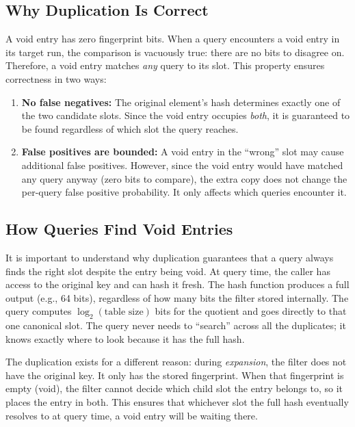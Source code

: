 \subsection{Why Duplication Is Correct}

A void entry has zero fingerprint bits. When a query encounters a 
void entry in its target run, the comparison is vacuously true: 
there are no bits to disagree on. Therefore, a void entry matches 
\emph{any} query to its slot. This property ensures correctness in 
two ways:

\begin{enumerate}
  \item \textbf{No false negatives:} The original element's hash 
        determines exactly one of the two candidate slots. Since the 
        void entry occupies \emph{both}, it is guaranteed to be found 
        regardless of which slot the query reaches.
  \item \textbf{False positives are bounded:} A void entry in the 
        ``wrong'' slot may cause additional false positives. However, 
        since the void entry would have matched any query anyway (zero 
        bits to compare), the extra copy does not change the per-query 
        false positive probability. It only affects which queries 
        encounter it.
\end{enumerate}

\subsection{How Queries Find Void Entries}

It is important to understand why duplication guarantees that a query 
always finds the right slot despite the entry being void. At query 
time, the caller has access to the original key and can hash it fresh. 
The hash function produces a full output (e.g., 64 bits), regardless 
of how many bits the filter stored internally. The query computes 
$\log_2(\text{table size})$ bits for the quotient and goes directly 
to that one canonical slot. The query never needs to ``search'' 
across all the duplicates; it knows exactly where to look because it 
has the full hash.

The duplication exists for a different reason: during \emph{expansion}, 
the filter does not have the original key. It only has the stored 
fingerprint. When that fingerprint is empty (void), the filter cannot 
decide which child slot the entry belongs to, so it places the entry 
in both. This ensures that whichever slot the full hash eventually 
resolves to at query time, a void entry will be waiting there.

